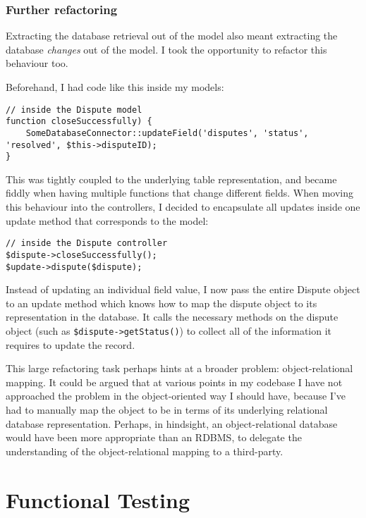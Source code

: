 \subsubsection{Further refactoring}

Extracting the database retrieval out of the model also meant extracting the database \emph{changes} out of the model. I took the opportunity to refactor this behaviour too.

Beforehand, I had code like this inside my models:

\begin{lstlisting}
// inside the Dispute model
function closeSuccessfully) {
    SomeDatabaseConnector::updateField('disputes', 'status', 'resolved', $this->disputeID);
}
\end{lstlisting}

This was tightly coupled to the underlying table representation, and became fiddly when having multiple functions that change different fields. When moving this behaviour into the controllers, I decided to encapsulate all updates inside one update method that corresponds to the model:

\begin{lstlisting}
// inside the Dispute controller
$dispute->closeSuccessfully();
$update->dispute($dispute);
\end{lstlisting}

Instead of updating an individual field value, I now pass the entire Dispute object to an update method which knows how to map the dispute object to its representation in the database. It calls the necessary methods on the dispute object (such as \lstinline{$dispute->getStatus()}) to collect all of the information it requires to update the record. 

This large refactoring task perhaps hints at a broader problem: object-relational mapping. It could be argued that at various points in my codebase I have not approached the problem in the object-oriented way I should have, because I've had to manually map the object to be in terms of its underlying relational database representation. Perhaps, in hindsight, an object-relational database would have been more appropriate than an RDBMS, to delegate the understanding of the object-relational mapping to a third-party.

\section{Functional Testing}

